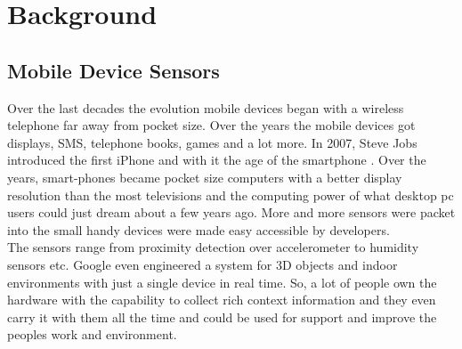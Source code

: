 \chapter{Background}

\section{Mobile Device Sensors}
Over the last decades the evolution mobile devices began with a wireless telephone far away from pocket size. Over the years the mobile devices got displays, SMS, telephone books, games and a lot more. In 2007, Steve Jobs introduced the first iPhone and with it the age of the smartphone  \cite{laugesen2010factors}. Over the years, smart-phones became pocket size computers with a better display resolution than the most televisions and the computing power of what desktop pc users could just dream about a few years ago. More and more sensors were packet into the small handy devices were made easy accessible by developers. \\
The sensors range from proximity detection over accelerometer to humidity sensors etc. Google even engineered a system for 3D objects and indoor environments with just a single device in real time.  
So, a lot of people own the hardware with the capability to collect rich context information and they even carry it with them all the time and could be used for support and improve the peoples work and environment.



